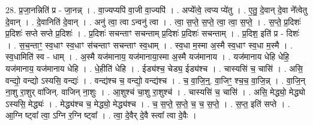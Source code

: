 \documentclass[17pt]{extarticle}
\begin{document}
28. प्र॒जा॒नन्निति॑ प्र - जा॒नन्न् । . वा॒ज्यप्यपि॑ वा॒जी वा॒ज्यपि॑ । . अप्ये᳚त्वे॒ त्वप्य प्ये॑तु । . ए॒तु॒ दे॒वान् दे॒वा ने᳚त्वेतु दे॒वान् । . दे॒वानिति॑ दे॒वान् । . अनु॑ त्वा॒ त्वा ऽन्वनु॑ त्वा । . त्वा॒ स॒प्ते॒ स॒प्ते॒ त्वा॒ त्वा॒ स॒प्ते॒ । . स॒प्ते॒ प्र॒दिशः॑ प्र॒दिशः॑ सप्ते सप्ते प्र॒दिशः॑ । . प्र॒दिशः॑ सचन्ताꣳ सचन्ताम् प्र॒दिशः॑ प्र॒दिशः॑ सचन्ताम् । . प्र॒दिश॒ इति॑ प्र - दिशः॑ । . स॒च॒न्ताꣳ॒॒ स्व॒धाꣳ स्व॒धाꣳ स॑चन्ताꣳ सचन्ताꣳ स्व॒धाम् । . स्व॒धा म॒स्मा अ॒स्मै स्व॒धाꣳ स्व॒धा म॒स्मै । . स्व॒धामिति॑ स्व - धाम् । . अ॒स्मै यज॑मानाय॒ यज॑मानाया॒स्मा अ॒स्मै यज॑मानाय । . यज॑मानाय धेहि धेहि॒ यज॑मानाय॒ यज॑मानाय धेहि । . धे॒हीति॑ धेहि । . ईड्य॑श्च॒ चेड्य॒ ईड्य॑श्च । . चास्यसि॑ च॒ चासि॑ । . असि॒ वन्द्यो॒ वन्द्यो ऽस्यसि॒ वन्द्यः॑ । . वन्द्य॑श्च च॒ वन्द्यो॒ वन्द्य॑श्च । . च॒ वा॒जि॒न्॒. वा॒जिꣳ॒॒ श्च॒च॒ वा॒जि॒न्न् । . वा॒जि॒न् ना॒शु रा॒शुर् वा॑जिन्. वाजिन् ना॒शुः । . आ॒शुश्च॑ चा॒शु रा॒शुश्च॑ । . चास्यसि॑ च॒ चासि॑ । . असि॒ मेद्ध्यो॒ मेद्ध्यो ऽस्यसि॒ मेद्ध्यः॑ । . मेद्ध्य॑श्च च॒ मेद्ध्यो॒ मेद्ध्य॑श्च । . च॒ स॒प्ते॒ स॒प्ते॒ च॒ च॒ स॒प्ते॒ । . स॒प्त॒ इति॑ सप्ते । . आ॒ग्नि ष्ट्वा᳚ त्वा॒ ऽग्नि र॒ग्नि ष्ट्वा᳚ । . त्वा॒ दे॒वैर् दे॒वै स्त्वा᳚ त्वा दे॒वैः । \newline
\end{document}
